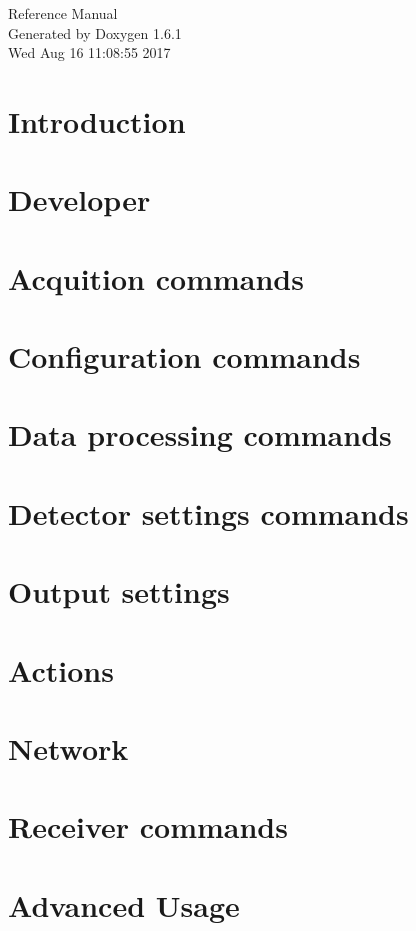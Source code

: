 \documentclass[a4paper]{article}
\begin{document}
\hypersetup{pageanchor=false}
\begin{titlepage}
\vspace*{7cm}
\begin{center}
{\Large Reference Manual}\\
\vspace*{1cm}
{\large Generated by Doxygen 1.6.1}\\
\vspace*{0.5cm}
{\small Wed Aug 16 11:08:55 2017}\\
\end{center}
\end{titlepage}
\tableofcontents
{}
\hypersetup{pageanchor=true}
\section{Introduction}
\label{index}\hypertarget{index}{}
\section{Developer}
\label{test}
\hypertarget{test}{}

\section{Acquition commands}
\label{acquisition}
\hypertarget{acquisition}{}

\section{Configuration commands}
\label{config}
\hypertarget{config}{}

\section{Data processing commands}
\label{data}
\hypertarget{data}{}

\section{Detector settings commands}
\label{settings}
\hypertarget{settings}{}

\section{Output settings}
\label{output}
\hypertarget{output}{}

\section{Actions}
\label{actions}
\hypertarget{actions}{}

\section{Network}
\label{network}
\hypertarget{network}{}

\section{Receiver commands}
\label{receiver}
\hypertarget{receiver}{}

\section{Advanced Usage}
\label{advanced}
\hypertarget{advanced}{}

\printindex
\end{document}

